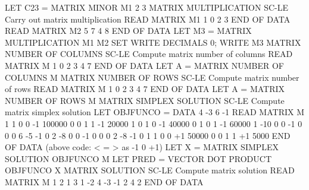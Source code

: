                                   LET C23 = MATRIX MINOR M1 2 3
MATRIX MULTIPLICATION       SC-LE Carry out matrix multiplication
                                  READ MATRIX M1
                                  1 0
                                  2 3
                                  END OF DATA
                                  READ MATRIX M2
                                  5 7
                                  4 8
                                  END OF DATA
                                  LET M3 = MATRIX MULTIPLICATION M1 M2
                                  SET WRITE DECIMALS 0; WRITE M3
MATRIX NUMBER OF COLUMNS    SC-LE Compute matrix number of columns
                                  READ MATRIX M
                                  1 0
                                  2 3
                                  4 7
                                  END OF DATA
                                  LET A = MATRIX NUMBER OF COLUMNS M
MATRIX NUMBER OF ROWS       SC-LE Compute matrix number of rows
                                  READ MATRIX M
                                  1 0
                                  2 3
                                  4 7
                                  END OF DATA
                                  LET A = MATRIX NUMBER OF ROWS M
MATRIX SIMPLEX SOLUTION     SC-LE Compute matrix simplex solution
                                  LET OBJFUNCO = DATA 4 -3 6 -1
                                  READ MATRIX M
                                  1 1 0 0     -1   100000
                                  0 0 1 1     -1    20000
                                  1 0 1 0     -1    40000
                                  0 1 0 1     -1    60000
                                  1 -10 0 0   -1        0
                                  0 0 6 -5    -1        0
                                  2 -8 0 0    -1        0
                                  0 0 2 -8    -1        0
                                  1 1 0 0     +1    50000
                                  0 0 1 1     +1     5000
                                  END OF DATA
                                  (above code:  < = > as -1 0 +1)
                                  LET X = MATRIX SIMPLEX SOLUTION OBJFUNCO M
                                  LET PRED = VECTOR DOT PRODUCT OBJFUNCO X
MATRIX SOLUTION             SC-LE Compute matrix solution
                                  READ MATRIX M
                                  1 2 1
                                  3 1 -2
                                  4 -3 -1
                                  2 4 2
                                  END OF DATA
